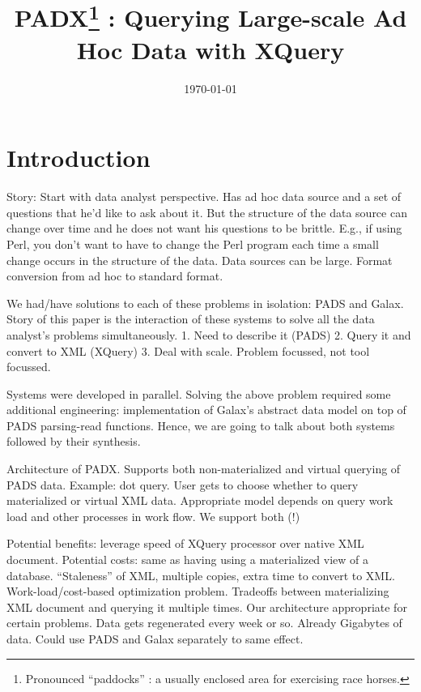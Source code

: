 \documentclass{sigplanconf}
\title{PADX\footnote{Pronounced ``paddocks'' : a usually enclosed area
for exercising race horses.} : Querying Large-scale Ad Hoc Data with XQuery}
\date{\today}
\begin{document}
\maketitle
\begin{abstract}
\end{abstract}

\section{Introduction}
\label{section:intro}
Story: Start with data analyst perspective.  Has ad hoc data source
and a set of questions that he'd like to ask about it.  But the
structure of the data source can change over time and he does not want
his questions to be brittle.  E.g., if using Perl, you don't want to
have to change the Perl program each time a small change occurs in the
structure of the data.  Data sources can be large.  Format conversion
from ad hoc to standard format.  

We had/have solutions to each of these problems in isolation: PADS and
Galax.  Story of this paper is the interaction of these systems to
solve all the data analyst's problems simultaneously. 
1. Need to describe it (PADS)
2. Query it and convert to XML (XQuery) 
3. Deal with scale.
Problem focussed, not tool focussed. 

Systems were developed in parallel.  Solving the above problem
required some additional engineering: implementation of Galax's
abstract data model on top of PADS parsing-read functions.  
Hence, we are going to talk about both systems followed by their
synthesis. 

Architecture of PADX.  Supports both non-materialized and virtual
querying of PADS data.  Example: dot query.  User gets to choose
whether to query materialized or virtual XML data.  Appropriate model
depends on query work load and other processes in work flow.  We
support both (!)

Potential benefits: leverage speed of
XQuery processor over native XML document.  Potential costs: same as
having using a materialized view of a database.  ``Staleness'' of XML,
multiple copies, extra time to convert to XML.  Work-load/cost-based
optimization problem.  Tradeoffs between materializing XML document
and querying it multiple times.  Our architecture appropriate for
certain problems.  Data gets regenerated every week or so.  Already
Gigabytes of data.  Could use PADS and Galax separately to same
effect.
 
\end{document}
